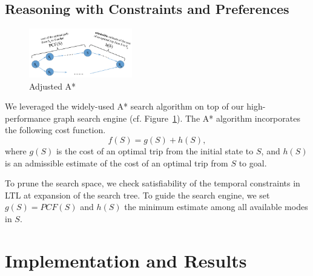 \documentclass[letterpaper]{article}
\newcommand{\PCF}{\mathit{PCF}}
\newcommand{\figref}[1]{Figure~\ref{fig:#1}}
\begin{document}
\subsection{Reasoning with Constraints and Preferences}

\begin{figure}[!ht]
  \centering
    \includegraphics[width=0.4\textwidth]{figs/Astar.pdf}
  \caption{Adjusted A*\label{fig:astar}}
\end{figure}

We leveraged the widely-used A* search algorithm on top of our high-performance graph search
engine (cf. \figref{astar}).  The A* algorithm incorporates the following cost function.
\begin{equation}
	f(S) = g(S) + h(S),
\end{equation}
where $g(S)$ is the cost of an optimal trip from the initial state to $S$, and
$h(S)$ is an admissible estimate of the cost of an optimal trip from $S$ to goal.

To prune the search space, we check satisfiability of the temporal constraints in LTL
at expansion of the search tree.
To guide the search engine, we set $g(S)=\PCF(S)$ and $h(S)$ the minimum estimate among
all available modes in $S$.

\section{Implementation and Results}
\end{document}
